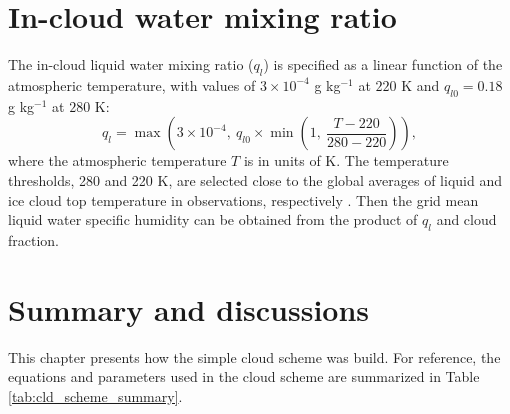 \section{In-cloud water mixing ratio}

The in-cloud liquid water mixing ratio ($q_l$) is specified as a linear function of the atmospheric temperature, with values of $3\times 10^{-4}$ g kg$^{-1}$ at $220$ K and $q_{l0}=0.18$ g kg$^{-1}$ at $280$ K:
\begin{equation}
	q_l = \max\left(3\times 10^{-4}, ~q_{l0}\times  \min\left(1, ~\frac{T-220}{280-220}\right)\right),
	\label{eq:qcl}
\end{equation}
where the atmospheric temperature $T$ is in units of K. The temperature thresholds, 280 and 220 K, are selected close to the global averages of liquid and ice cloud top temperature in observations, respectively \citep[Fig. 4 in][]{Stubenrauch2013}. Then the grid mean liquid water specific humidity can be obtained from the product of $q_l$ and cloud fraction.

\section{Summary and discussions}

This chapter presents how the simple cloud scheme was build. For reference, the equations and parameters used in the cloud scheme are summarized in Table \ref{tab:cld_scheme_summary}. 


